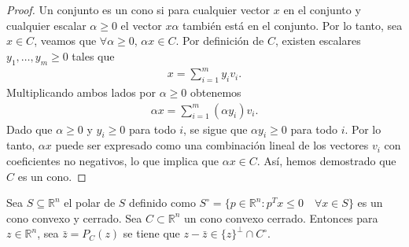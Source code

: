 \documentclass{article}
\newcommand{\R}{\mathbb{R}}
\newenvironment{theorem}[2][Ejercicio]{\begin{trivlist}
\item[\hskip \labelsep {\bfseries #1}\hskip \labelsep {\bfseries #2.}]}{\end{trivlist}}
\begin{document}
\begin{proof}
    Un conjunto es un cono si para cualquier vector \( x \) en el conjunto y cualquier escalar \( \alpha \geq 0 \) el vector \( x \alpha \) también está en el conjunto.
    Por lo tanto, sea \( x \in C \), veamos que \( \forall \alpha \geq 0 \), \( \alpha x \in C \).
    Por definición de \( C \), existen escalares \( y_1, \ldots, y_m \geq 0 \) tales que \begin{align*}
        x = \sum_{i=1}^{m} y_i v_i.
    \end{align*}
    Multiplicando ambos lados por \( \alpha \geq 0 \) obtenemos \begin{align*}
        \alpha x = \sum_{i=1}^{m} (\alpha y_i) v_i.
    \end{align*}
    Dado que \( \alpha \geq 0 \) y \( y_i \geq 0 \) para todo \( i \), se sigue que \( \alpha y_i \geq 0 \) para todo \( i \).
    Por lo tanto, \( \alpha x \) puede ser expresado como una combinación lineal de los vectores \( v_i \) con coeficientes no negativos, lo que implica que \( \alpha x \in C \).
    Así, hemos demostrado que \( C \) es un cono.
\end{proof}

\clearpage

\begin{theorem}{5}
    Sea \( S \subseteq \R^n \) el polar de \( S \) definido como \( S^{\circ} = \{ p \in \R^n : p^T x \leq 0 \quad \forall x \in S \} \) es un cono convexo y cerrado. Sea \( C \subset \R^n \) un cono convexo cerrado. Entonces
    para \( z \in \R^n \), sea \( \bar{z} = P_C(z) \) se tiene que \( z - \bar{z} \in {\{ z \}}^{\perp} \cap C^{\circ} \).
\end{theorem}
\end{document}
